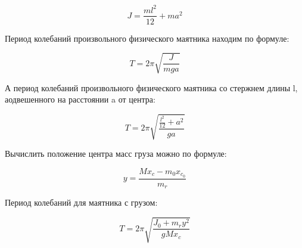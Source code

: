 \begin{equation} \label{момент инерции}
    J = \frac{ml^2}{12} + ma^2
\end{equation}

    Период колебаний произвольного физического маятника находим по формуле:
    
\begin{equation} \label{период}
    T = 2\pi\sqrt{\frac{J}{m g a}}
\end{equation}

    А период колебаний произвольного физического маятника со стержнем длины l, аодвешенного  на расстоянии a от центра:
    
\begin{equation} \label{период с а}
    T = 2\pi\sqrt{\frac{\frac{l^2}{12} + a^2}{g a}}
\end{equation}

    Вычислить положение центра масс груза можно по формуле:
   
\begin{equation} \label{центр масс груза}
    y = \frac{M x_{c} - m_0x_{c_0}}{m_r}
\end{equation}

    Период колебаний для маятника с грузом:

\begin{equation}\label{период с грузом}
    T = 2\pi\sqrt{\frac{J_0 + m_r y^2}{g M x_c}}
\end{equation}


